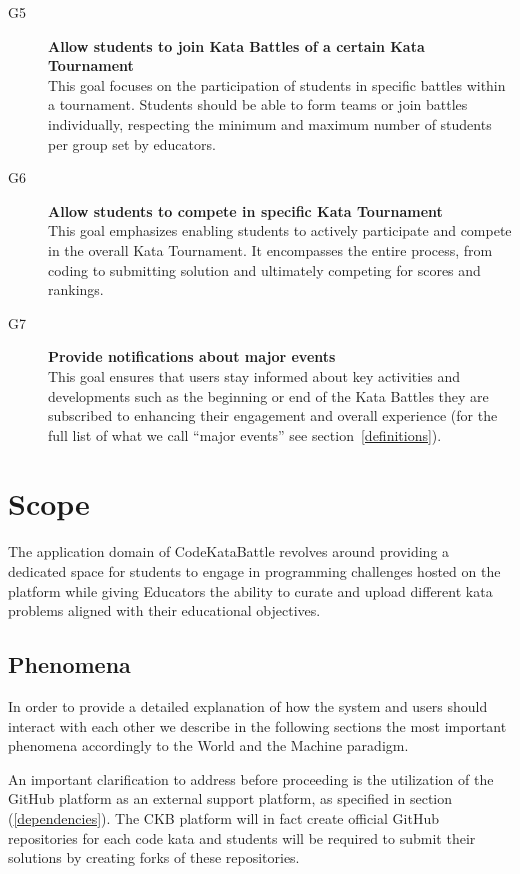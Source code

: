 \documentclass[11pt]{report}
\begin{document}
\begin{description}
        \item[G5] \textbf{Allow students to join Kata Battles of a certain Kata Tournament}
            \\
            This goal focuses on the participation of students in specific battles within a tournament.
            Students should be able to form teams or join battles individually, respecting the minimum and maximum number
            of students per group set by educators.
        \item[G6] \textbf{Allow students to compete in specific Kata Tournament}
            \\
            This goal emphasizes enabling students to actively participate and compete in the overall Kata Tournament.
            It encompasses the entire process, from coding to submitting solution and ultimately competing for scores and rankings.
        \item[G7] \textbf{Provide notifications about major events}
            \\
            This goal ensures that users stay informed about key activities and developments
            such as the beginning or end of the Kata Battles they are subscribed to 
            enhancing their engagement and overall experience
           (for the full list of what we call ``major events'' see section~\ref{definitions}).
    \end{description}

    \newpage
    \section{Scope}
    The application domain of CodeKataBattle revolves around providing a dedicated space for students to engage in programming challenges hosted on the platform
    while giving Educators the ability to curate and upload different kata problems aligned with their educational objectives.

    \subsection*{Phenomena}
    In order to provide a detailed explanation of how the system and users should interact with each other we describe in the following sections
    the most important phenomena accordingly to the World and the Machine paradigm.

    An important clarification to address before proceeding is the utilization of the GitHub platform as an external support platform, as specified in section (\ref{dependencies}).
    The CKB platform will in fact create official GitHub repositories for each code kata and students will be required to submit their solutions by creating forks of these repositories.
\end{document}

